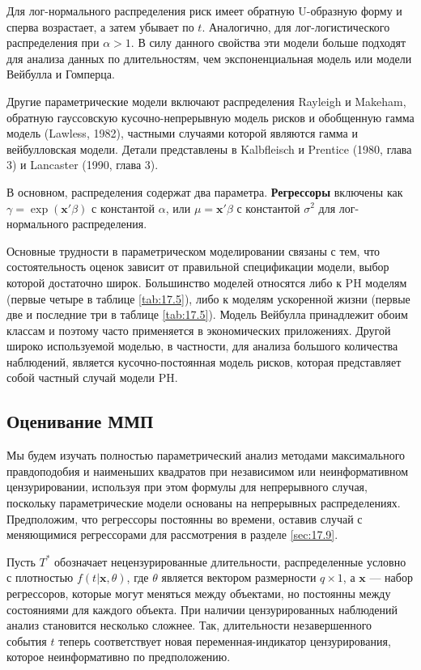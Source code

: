 Для лог-нормального распределения риск имеет обратную U-образную форму и сперва возрастает, а затем убывает по $t$. Аналогично, для лог-логистического распределения при $\alpha>1$. В силу данного свойства эти модели больше подходят для анализа данных по длительностям, чем экспоненциальная модель или модели Вейбулла и Гомперца.

Другие параметрические модели включают распределения Rayleigh и Makeham, обратную гауссовскую кусочно-непрерывную модель рисков и обобщенную гамма модель (Lawless, 1982), частными случаями которой являются гамма и вейбулловская модели. Детали представлены в Kalbfleisch и Prentice (1980, глава 3) и Lancaster (1990, глава 3).

В основном, распределения содержат два параметра. %
\textbf{Регрессоры} включены как $\gamma=\exp{(\mathbf{x}'\beta)}$ с константой $\alpha$, или $\mu=\mathbf{x}'\beta$ с константой $\sigma^2$ для лог-нормального распределения.

Основные трудности в параметрическом моделировании связаны с тем, что состоятельность оценок зависит от правильной спецификации модели, выбор которой достаточно широк. Большинство моделей относятся либо к PH моделям (первые четыре в таблице \ref{tab:17.5}), либо к моделям ускоренной жизни (первые две и последние три в таблице \ref{tab:17.5}). Модель Вейбулла принадлежит обоим классам и поэтому часто применяется в экономических приложениях. Другой широко используемой моделью, в частности, для анализа большого количества наблюдений, является кусочно-постоянная модель рисков, которая представляет собой частный случай модели PH.


\subsection{Оценивание ММП}\label{sec:17.6.3}

\noindent
Мы будем изучать полностью параметрический анализ методами максимального правдоподобия и наименьших квадратов при независимом или неинформативном цензурировании, используя при этом формулы для непрерывного случая, поскольку параметрические модели основаны на непрерывных распределениях. Предположим, что регрессоры постоянны во времени, оставив случай с меняющимися регрессорами для рассмотрения в разделе \ref{sec:17.9}.

Пусть $T^*$ обозначает нецензурированные длительности, распределенные условно с плотностью $f(t|\mathbf{x},\theta)$, где $\theta$ является вектором размерности $q\times1$, а $\mathbf{x}$ --- набор регрессоров, которые могут меняться между объектами, но постоянны между состояниями для каждого объекта. При наличии цензурированных наблюдений анализ становится несколько сложнее. Так, длительности незавершенного события $t$ теперь соответствует новая переменная-индикатор цензурирования, которое неинформативно по предположению.

